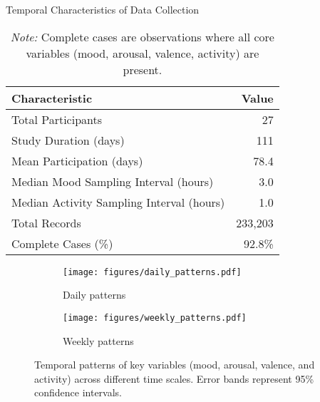 \documentclass[11pt,a4paper]{article}
\begin{document}
\begin{table}[htbp]
\centering
\caption{Temporal Characteristics of Data Collection}
\label{tab:temporal-properties}
\begin{tabular}{lr}
\toprule
\textbf{Characteristic} & \textbf{Value} \\
\midrule
Total Participants & 27 \\
Study Duration (days) & 111 \\
Mean Participation (days) & 78.4 \\
Median Mood Sampling Interval (hours) & 3.0 \\
Median Activity Sampling Interval (hours) & 1.0 \\
Total Records & 233,203 \\
Complete Cases (\%) & 92.8\% \\
\bottomrule
\end{tabular}
\caption*{\textit{Note:} Complete cases are observations where all core variables (mood, arousal, valence, activity) are present.}
\end{table}

\begin{figure}[htbp]
    \centering
    \begin{subfigure}[b]{0.48\textwidth}
        \texttt{[image: figures/daily\_patterns.pdf]}
        \caption{Daily patterns}
        \label{fig:daily_patterns}
    \end{subfigure}
    \hfill
    \begin{subfigure}[b]{0.48\textwidth}
        \texttt{[image: figures/weekly\_patterns.pdf]}
        \caption{Weekly patterns}
        \label{fig:weekly_patterns}
    \end{subfigure}
    \caption{Temporal patterns of key variables (mood, arousal, valence, and activity) across different time scales. Error bands represent 95\% confidence intervals.}
    \label{fig:temporal_patterns}
\end{figure}
\end{document}
